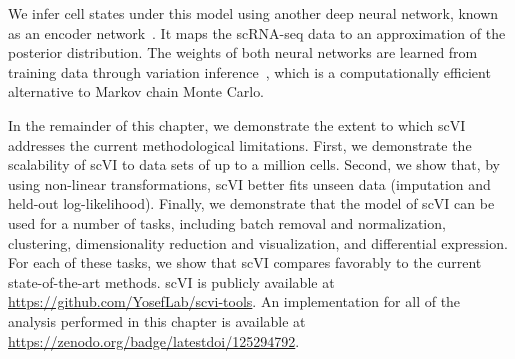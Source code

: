 We infer cell states under this model using another deep neural network, known as an encoder network~\cite{kingma2013}. It maps the scRNA-seq data to an approximation of the posterior distribution.
The weights of both neural networks are learned from training data through variation inference~\cite{blei2017variational}, which is a computationally efficient alternative to Markov chain Monte Carlo. 

In the remainder of this chapter, we demonstrate the extent to which scVI addresses the current methodological limitations. First, we demonstrate the scalability of scVI to data sets of up to a million cells. Second, we show that, by using non-linear transformations, scVI better fits unseen data (imputation and held-out log-likelihood). Finally, we demonstrate that the model of scVI can be used for a number of tasks, including batch removal and normalization, clustering, dimensionality reduction and visualization, and differential expression. For each of these tasks, we show that scVI compares favorably to the current state-of-the-art methods. scVI is publicly available at
\url{https://github.com/YosefLab/scvi-tools}. An implementation for all of the analysis performed in this chapter is available at \url{https://zenodo.org/badge/latestdoi/125294792}.
